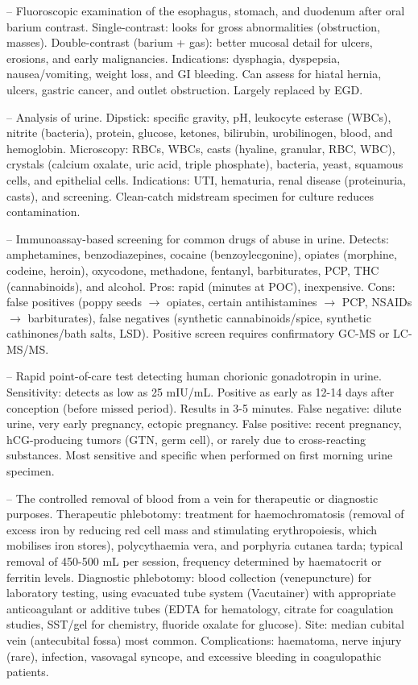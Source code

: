 -- Fluoroscopic examination of the esophagus, stomach, and duodenum after oral barium contrast. Single-contrast: looks for gross abnormalities (obstruction, masses). Double-contrast (barium + gas): better mucosal detail for ulcers, erosions, and early malignancies. Indications: dysphagia, dyspepsia, nausea/vomiting, weight loss, and GI bleeding. Can assess for hiatal hernia, ulcers, gastric cancer, and outlet obstruction. Largely replaced by EGD.

-- Analysis of urine. Dipstick: specific gravity, pH, leukocyte esterase (WBCs), nitrite (bacteria), protein, glucose, ketones, bilirubin, urobilinogen, blood, and hemoglobin. Microscopy: RBCs, WBCs, casts (hyaline, granular, RBC, WBC), crystals (calcium oxalate, uric acid, triple phosphate), bacteria, yeast, squamous cells, and epithelial cells. Indications: UTI, hematuria, renal disease (proteinuria, casts), and screening. Clean-catch midstream specimen for culture reduces contamination.

-- Immunoassay-based screening for common drugs of abuse in urine. Detects: amphetamines, benzodiazepines, cocaine (benzoylecgonine), opiates (morphine, codeine, heroin), oxycodone, methadone, fentanyl, barbiturates, PCP, THC (cannabinoids), and alcohol. Pros: rapid (minutes at POC), inexpensive. Cons: false positives (poppy seeds $\rightarrow$ opiates, certain antihistamines $\rightarrow$ PCP, NSAIDs $\rightarrow$ barbiturates), false negatives (synthetic cannabinoids/spice, synthetic cathinones/bath salts, LSD). Positive screen requires confirmatory GC-MS or LC-MS/MS.

-- Rapid point-of-care test detecting human chorionic gonadotropin in urine. Sensitivity: detects as low as 25 mIU/mL. Positive as early as 12-14 days after conception (before missed period). Results in 3-5 minutes. False negative: dilute urine, very early pregnancy, ectopic pregnancy. False positive: recent pregnancy, hCG-producing tumors (GTN, germ cell), or rarely due to cross-reacting substances. Most sensitive and specific when performed on first morning urine specimen.

-- The controlled removal of blood from a vein for therapeutic or diagnostic purposes. Therapeutic phlebotomy: treatment for haemochromatosis (removal of excess iron by reducing red cell mass and stimulating erythropoiesis, which mobilises iron stores), polycythaemia vera, and porphyria cutanea tarda; typical removal of 450-500 mL per session, frequency determined by haematocrit or ferritin levels. Diagnostic phlebotomy: blood collection (venepuncture) for laboratory testing, using evacuated tube system (Vacutainer) with appropriate anticoagulant or additive tubes (EDTA for hematology, citrate for coagulation studies, SST/gel for chemistry, fluoride oxalate for glucose). Site: median cubital vein (antecubital fossa) most common. Complications: haematoma, nerve injury (rare), infection, vasovagal syncope, and excessive bleeding in coagulopathic patients.

